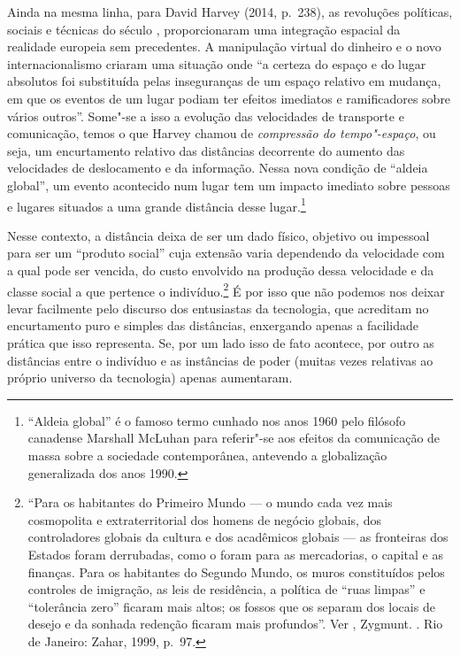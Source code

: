 Ainda na mesma linha, para David Harvey (2014, p.~238), as revoluções políticas,
sociais e técnicas do século , proporcionaram uma integração espacial
da realidade europeia sem precedentes. A manipulação virtual do dinheiro
e o novo internacionalismo criaram uma situação onde ``a certeza do
espaço e do lugar absolutos foi substituída pelas inseguranças de um
espaço relativo em mudança, em que os eventos de um lugar podiam ter
efeitos imediatos e ramificadores sobre vários outros''.
Some"-se a isso a evolução das velocidades de transporte e comunicação,
temos o que Harvey chamou de \emph{compressão do tempo"-espaço}, ou seja,
um encurtamento relativo das distâncias decorrente do aumento das
velocidades de deslocamento e da informação. Nessa nova condição de
``aldeia global'', um evento acontecido num lugar tem um impacto
imediato sobre pessoas e lugares situados a uma grande distância desse
lugar.\footnote{``Aldeia global'' é o famoso termo cunhado nos anos 1960
  pelo filósofo canadense Marshall \label{mcluhan}
  McLuhan para referir"-se aos efeitos da comunicação de massa sobre a
  sociedade contemporânea, antevendo a globalização generalizada dos
  anos 1990.}

Nesse contexto, a distância deixa de ser um dado físico, objetivo ou
impessoal para ser um ``produto social'' cuja extensão varia dependendo
da velocidade com a qual pode ser vencida, do custo envolvido na
produção dessa velocidade e da classe social a que pertence o
indivíduo.\footnote{``Para os habitantes do Primeiro Mundo --- o mundo
  cada vez mais cosmopolita e extraterritorial dos homens de negócio
  globais, dos controladores globais da cultura e dos acadêmicos globais
  --- as fronteiras dos Estados foram derrubadas, como o foram para as
  mercadorias, o capital e as finanças. Para os habitantes do Segundo
  Mundo, os muros constituídos pelos controles de imigração, as leis de
  residência, a política de ``ruas limpas'' e ``tolerância zero''
  ficaram mais altos; os fossos que os separam dos locais de desejo e da
  sonhada redenção ficaram mais profundos''. Ver ,
  Zygmunt. {}. Rio de
  Janeiro: Zahar, 1999, p.~97.} É por isso que não podemos nos deixar
levar facilmente pelo discurso dos entusiastas da tecnologia, que
acreditam no encurtamento puro e simples das distâncias, enxergando apenas
a facilidade prática que isso representa. Se, por um lado isso de fato
acontece, por outro as distâncias entre o indivíduo e as instâncias de
poder (muitas vezes relativas ao próprio universo da tecnologia) apenas
aumentaram.


